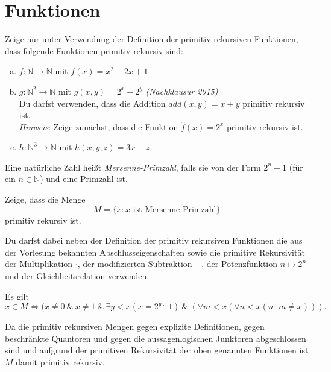 \documentclass[german,headsepline]{scrartcl}
\theoremstyle{definition}
\begin{document}
	\section{Funktionen}
	\begin{question}
		Zeige nur unter Verwendung der Definition der primitiv rekursiven Funktionen,
		dass folgende Funktionen primitiv rekursiv sind:
		\begin{enumerate}[(a)]
			\item $f:\mathbb{N}\to\mathbb{N}$ mit $f(x)=x^2+2x+1$
			\item $g:\mathbb{N}^2\to\mathbb{N}$ mit $g(x,y)=2^x+2^y$
				\hfill\textit{(Nachklausur 2015)} \\
				Du darfst verwenden, dass die Addition $add(x,y)=x+y$ primitiv rekursiv ist. \\
				\textit{Hinweis}: Zeige zunächst, dass die Funktion $\hat{f}(x)=2^x$ primitiv rekursiv ist.
			\item $h:\mathbb{N}^3\to\mathbb{N}$ mit $h(x,y,z)=3x+z$
		\end{enumerate}
	\end{question}
	
	\begin{question}[subtitle={Nachklausur 2013}]
		Eine natürliche Zahl heißt \emph{Mersenne-Primzahl}, falls sie von der Form $2^n-1$ (für ein $n\in\mathbb{N}$) und eine Primzahl ist.
		
		Zeige, dass die Menge
		\[M=\{x\colon x\text{ ist Mersenne-Primzahl}\}\]
		primitiv rekursiv ist.
		
		Du darfst dabei neben der Definition der primitiv rekursiven Funktionen die aus der Vorlesung bekannten Abschlusseigenschaften sowie die primitive Rekursivität der Multiplikation $\cdot$, der modifizierten Subtraktion $\dot{-}$, der Potenzfunktion $n\mapsto2^n$ und der Gleichheitsrelation verwenden.
	\end{question}
	\begin{solution}
		Es gilt
		\[x\in M\Leftrightarrow(x\neq0~\&~x\neq1~\&~\exists y<x(x=2^y\dot{-}1)~\&~(\forall m<x(\forall n<x(n\cdot m\neq x))).\]
		
		Da die primitiv rekursiven Mengen gegen explizite Definitionen,
		gegen beschränkte Quantoren und gegen die aussagenlogischen Junktoren abgeschlossen sind
		und aufgrund der primitiven Rekursivität der oben genannten Funktionen
		ist $M$ damit primitiv rekursiv.
	\end{solution}
	
\end{document}
